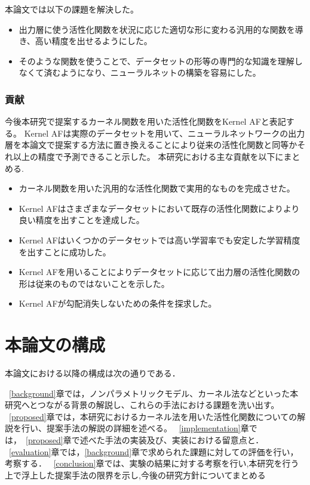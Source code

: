 本論文では以下の課題を解決した。
\begin{itemize}
  \item 出力層に使う活性化関数を状況に応じた適切な形に変わる汎用的な関数を導き、高い精度を出せるようにした。
  \item そのような関数を使うことで、データセットの形等の専門的な知識を理解しなくて済むようになり、ニューラルネットの構築を容易にした。
\end{itemize}

\subsubsection{貢献}

今後本研究で提案するカーネル関数を用いた活性化関数をKernel AFと表記する。
Kernel AFは実際のデータセットを用いて、ニューラルネットワークの出力層を本論文で提案する方法に置き換えることにより従来の活性化関数と同等かそれ以上の精度で予測できること示した。
本研究における主な貢献を以下にまとめる.

\begin{itemize}
  \item カーネル関数を用いた汎用的な活性化関数で実用的なものを完成させた。
  \item Kernel AFはさまざまなデータセットにおいて既存の活性化関数によりより良い精度を出すことを達成した。
  \item Kernel AFはいくつかのデータセットでは高い学習率でも安定した学習精度を出すことに成功した。
  \item Kernel AFを用いることによりデータセットに応じて出力層の活性化関数の形は従来のものではないことを示した。
  \item Kernel AFが勾配消失しないための条件を探求した。
\end{itemize}


\section{本論文の構成}

本論文における以降の構成は次の通りである．

~\ref{background}章では，ノンパラメトリックモデル、カーネル法などといった本研究へとつながる背景の解説し、これらの手法における課題を洗い出す。
~\ref{proposed}章では，本研究におけるカーネル法を用いた活性化関数についての解説を行い、提案手法の解説の詳細を述べる。
~\ref{implementation}章では，~\ref{proposed}章で述べた手法の実装及び、実装における留意点と．
~\ref{evaluation}章では，\ref{background}章で求められた課題に対しての評価を行い，考察する．
~\ref{conclusion}章では、実験の結果に対する考察を行い,本研究を行う上で浮上した提案手法の限界を示し,今後の研究方針についてまとめる







